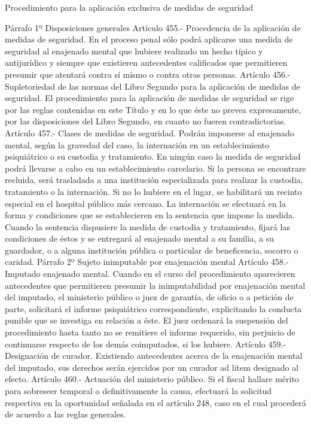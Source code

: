     Procedimiento para la aplicación exclusiva de
medidas de seguridad

    Párrafo 1º Disposiciones generales
    Artículo 455.- Procedencia de la aplicación de medidas de seguridad. En el proceso penal sólo podrá aplicarse una medida de seguridad al enajenado mental que hubiere realizado un hecho típico y antijurídico y siempre que existieren antecedentes calificados que permitieren presumir que atentará contra sí mismo o contra otras personas.
    Artículo 456.- Supletoriedad de las normas del Libro Segundo para la aplicación de medidas de seguridad. El procedimiento para la aplicación de medidas de seguridad se rige por las reglas contenidas en este Título y en lo que éste no prevea expresamente, por las disposiciones del Libro Segundo, en cuanto no fueren contradictorias.
    Artículo 457.- Clases de medidas de seguridad. Podrán imponerse al enajenado mental, según la gravedad del caso, la internación en un establecimiento psiquiátrico o su custodia y tratamiento.
    En ningún caso la medida de seguridad podrá llevarse a cabo en un establecimiento carcelario. Si la persona se encontrare recluida, será trasladada a una institución especializada para realizar la custodia, tratamiento o la internación. Si no lo hubiere en el lugar, se habilitará un recinto especial en el hospital público más cercano.
    La internación se efectuará en la forma y condiciones que se establecieren en la sentencia que impone la medida. Cuando la sentencia dispusiere la medida de custodia y tratamiento, fijará las condiciones de éstos y se entregará al enajenado mental a su familia, a su guardador, o a alguna institución pública o particular de beneficencia, socorro o caridad.
    Párrafo 2º Sujeto inimputable por enajenación
mental
    Artículo 458.- Imputado enajenado mental. Cuando en el curso del procedimiento aparecieren antecedentes que permitieren presumir la inimputabilidad por enajenación mental del imputado, el ministerio público o juez de garantía, de oficio o a petición de parte, solicitará el informe psiquiátrico correspondiente, explicitando la conducta punible que se investiga en relación a éste. El juez ordenará la suspensión del procedimiento hasta tanto no se remitiere el informe requerido, sin perjuicio de continuarse respecto de los demás coimputados, si los hubiere.
    Artículo 459.- Designación de curador. Existiendo antecedentes acerca de la enajenación mental del imputado, sus derechos serán ejercidos por un curador ad litem designado al efecto.
    Artículo 460.- Actuación del ministerio público. Si el fiscal hallare mérito para sobreseer temporal o definitivamente la causa, efectuará la solicitud respectiva en la oportunidad señalada en el artículo 248, caso en el cual procederá de acuerdo a las reglas generales.
